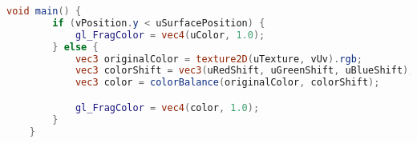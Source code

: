 
\begin{lstlisting}[language=GLSL]
	void main() {
		if (vPosition.y < uSurfacePosition) {
			gl_FragColor = vec4(uColor, 1.0);
		} else {
		    vec3 originalColor = texture2D(uTexture, vUv).rgb;
		    vec3 colorShift = vec3(uRedShift, uGreenShift, uBlueShift);
		    vec3 color = colorBalance(originalColor, colorShift);

			gl_FragColor = vec4(color, 1.0);
		}
	}
\end{lstlisting}
